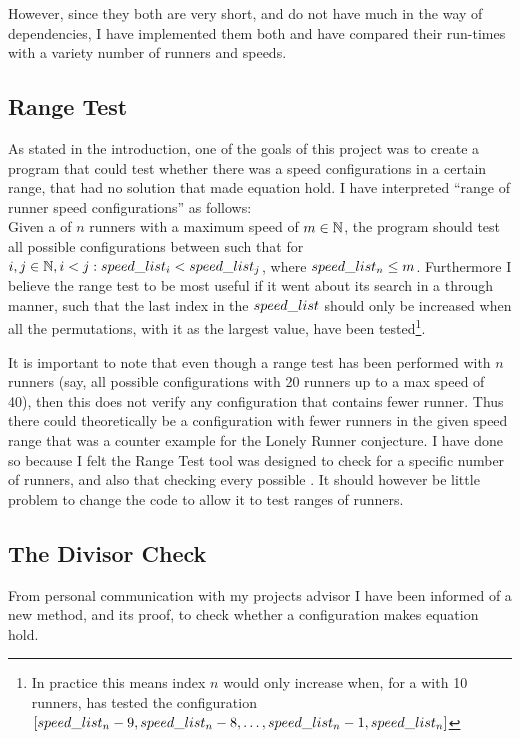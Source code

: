 However, since they both are very short, and do not have much in the way of dependencies, I have implemented them both and have compared their run-times with a variety number of runners and speeds.\\

\subsection{Range Test}
As stated in the introduction, one of the goals of this project was to create a program that could test whether there was a speed configurations in a certain range, that had no solution that made equation  hold. I have interpreted ``range of runner speed configurations'' as follows:\\

Given a \comS of $n$ runners with a maximum speed of $m \in \mathbb{N}$, the program should test all possible configurations between such that for $i, j \in \mathbb{N}, i < j: speed\_list_i < speed\_list_j$, where $speed\_list_n \leq m$. Furthermore I believe the range test to be most useful if it went about its search in a through manner, such that the last index in the $speed\_list$ should only be increased when all the permutations, with it as the largest value, have been tested\footnote{In practice this means index $n$ would only increase when, for a \comS with 10 runners, has tested the configuration $[speed\_list_n - 9, speed\_list_n - 8, \ldots, speed\_list_n - 1, speed\_list_n]$}. 

It is important to note that even though a range test has been performed with $n$ runners (say, all possible configurations with 20 runners up to a max speed of 40), then this does not verify any configuration that contains fewer runner. Thus there could theoretically be a configuration with fewer runners in the given speed range that was a counter example for the Lonely Runner conjecture. I have done so because I felt the Range Test tool was designed to check for a specific number of runners, and also that checking every possible   . It should however be little problem to change the code to allow it to test ranges of runners. 

\subsection{The Divisor Check}
\label{detect}
From personal communication with my projects advisor I have been informed of a new method, and its proof, to check whether a configuration makes equation  hold. 

